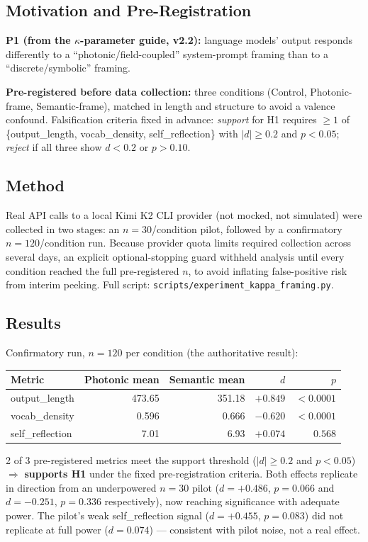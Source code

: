 \documentclass[12pt,a4paper]{article}
\theoremstyle{definition}
\begin{document}
\subsection{Motivation and Pre-Registration}

\begin{hypothesis}
\textbf{P1 (from the $\kappa$-parameter guide, v2.2):} language models' output
responds differently to a ``photonic/field-coupled'' system-prompt framing than to
a ``discrete/symbolic'' framing.

\textbf{Pre-registered before data collection:} three conditions (Control,
Photonic-frame, Semantic-frame), matched in length and structure to avoid a
valence confound. Falsification criteria fixed in advance: \emph{support} for H1
requires $\geq 1$ of \{output\_length, vocab\_density, self\_reflection\} with
$|d| \geq 0.2$ and $p < 0.05$; \emph{reject} if all three show $d < 0.2$ or
$p > 0.10$.
\end{hypothesis}

\subsection{Method}

Real API calls to a local Kimi K2 CLI provider (not mocked, not simulated) were
collected in two stages: an $n=30$/condition pilot, followed by a confirmatory
$n=120$/condition run. Because provider quota limits required collection across
several days, an explicit optional-stopping guard withheld analysis until every
condition reached the full pre-registered $n$, to avoid inflating false-positive
risk from interim peeking. Full script: \texttt{scripts/experiment\_kappa\_framing.py}.

\subsection{Results}

\begin{validated}
Confirmatory run, $n=120$ per condition (the authoritative result):
\begin{center}
\begin{tabular}{lrrrr}
\toprule
Metric & Photonic mean & Semantic mean & $d$ & $p$ \\
\midrule
output\_length   & 473.65 & 351.18 & $+0.849$ & $<0.0001$ \\
vocab\_density   & 0.596  & 0.666  & $-0.620$ & $<0.0001$ \\
self\_reflection & 7.01   & 6.93   & $+0.074$ & $0.568$   \\
\bottomrule
\end{tabular}
\end{center}
2 of 3 pre-registered metrics meet the support threshold ($|d|\geq0.2$ and
$p<0.05$) $\Rightarrow$ \textbf{supports H1} under the fixed pre-registration
criteria. Both effects replicate in direction from an underpowered $n=30$ pilot
($d=+0.486$, $p=0.066$ and $d=-0.251$, $p=0.336$ respectively), now reaching
significance with adequate power. The pilot's weak self\_reflection signal
($d=+0.455$, $p=0.083$) did not replicate at full power ($d=0.074$) --- consistent
with pilot noise, not a real effect.
\end{validated}
\end{document}
